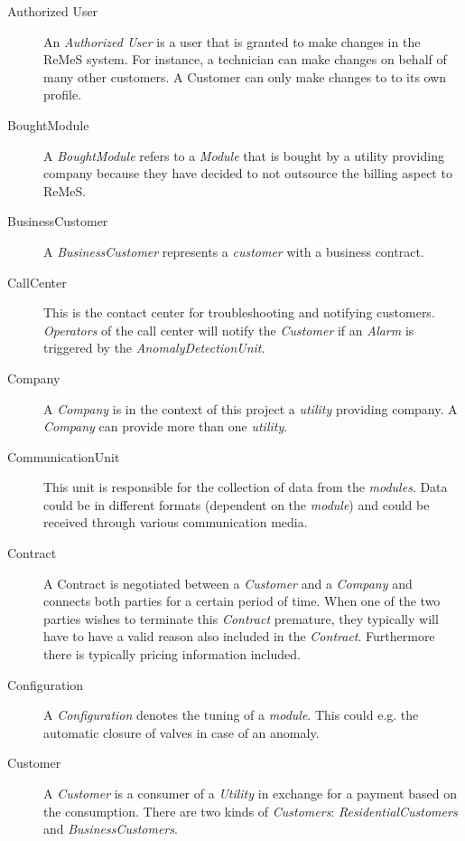 \begin{description}
\item[Authorized User] An \emph{Authorized User} is a user that is granted to
make changes in the ReMeS system. For instance, a technician can make changes
on behalf of many other customers. A Customer can only make changes to to its
own profile.

\item[BoughtModule] A \emph{BoughtModule} refers to a \emph{Module} that is
bought by a utility providing company because they have decided to not outsource
the billing aspect to ReMeS.

\item[BusinessCustomer] A \emph{BusinessCustomer} represents a \emph{customer}
with a business contract. 

\item[CallCenter] This is the contact center for troubleshooting and notifying
customers. \emph{Operators} of the call center will notify the \emph{Customer}
if an \emph{Alarm} is triggered by the \emph{AnomalyDetectionUnit}.

\item[Company] A \emph{Company} is in the context of this project a
\emph{utility} providing company. A \emph{Company} can provide more than one
\emph{utility}.

\item[CommunicationUnit] This unit is responsible for the collection of data
from the \emph{modules}. Data could be in different formats (dependent on
the \emph{module}) and could be received through various communication media.

\item[Contract] A Contract is negotiated between a \emph{Customer} and a
\emph{Company} and connects both parties for a certain period of
time. When one of the two parties wishes to terminate this \emph{Contract}
premature, they typically will have to have a valid reason also included in the
\emph{Contract}. Furthermore there is typically pricing information included.

\item[Configuration] A \emph{Configuration} denotes the tuning of a
\emph{module}. This could e.g. the automatic closure of valves in case of an
anomaly.

\item[Customer] A \emph{Customer} is a consumer of a \emph{Utility} in exchange
for a payment based on the consumption. There are two kinds of
\emph{Customers}: \emph{ResidentialCustomers} and \emph{BusinessCustomers}.


\end{description}
